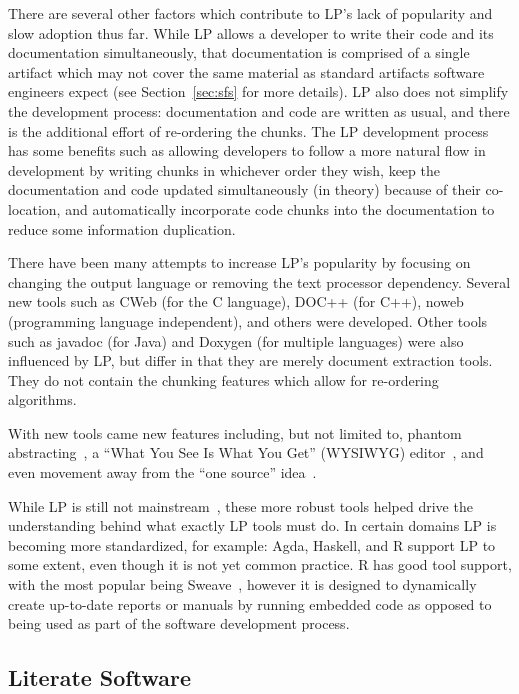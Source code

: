 There are several other factors which contribute to LP's lack of popularity and 
slow adoption thus far. While LP allows a developer to write their code and its 
documentation simultaneously, that documentation is comprised of a single 
artifact which may not cover the same material as standard artifacts software 
engineers expect (see Section~\ref{sec:sfs} for more details). LP also does not 
simplify the development process: documentation and code are written as usual, 
and there is the additional effort of re-ordering the chunks. The LP 
development process has some benefits such as allowing developers to follow a 
more natural flow in development by writing chunks in whichever order they 
wish, keep the documentation and code updated simultaneously (in theory) 
because of their co-location, and automatically incorporate code chunks into 
the documentation to reduce some information duplication.

There have been many attempts to increase LP's popularity by focusing on 
changing the output language or removing the text processor dependency. Several
new tools such as CWeb (for the C language), DOC++ (for C++), noweb 
(programming language independent), and others were developed. Other tools such 
as javadoc (for Java) and Doxygen (for multiple languages) were also influenced 
by LP, but differ in that they are merely document extraction tools. They do 
not contain the chunking features which allow for re-ordering algorithms.

With new tools came new features including, but not limited to, phantom
abstracting~\cite{ShumAndCook1993}, a ``What You See Is What You Get'' (WYSIWYG)
editor~\cite{FritzsonGunnarssonAndJirstrand2002}, and even movement away from 
the ``one source'' idea~\cite{Simonis2003}.

While LP is still not mainstream~\cite{Ramsey1994}, these more robust 
tools helped drive the understanding behind what exactly LP tools must 
do. In certain domains LP is becoming more standardized, for 
example: Agda, Haskell, and R support LP to some extent, even though it is not 
yet common practice. R has good tool support, with the most popular being
Sweave~\cite{Leisch2002}, however it is designed to dynamically create
up-to-date reports or manuals by running embedded code as opposed to being used
as part of the software development process. 

\subsection{Literate Software}

